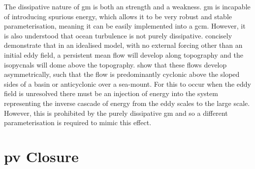 \documentclass[12pt,a4paper]{report}
\begin{document}
        The dissipative nature of \gls{gm} is both an strength and a
         weakness. \gls{gm} is incapable of introducing spurious energy,
         which allows it to be very robust and stable
         parameterisation, meaning it can be easily implemented 
         into a \gls{gcm}. However, it is also understood that
         ocean turbulence is not purely dissipative.
          \cite{adcock2000interactions} concisely demonstrate that
         in an idealised model, with no external forcing other
         than an initial eddy field, a persistent mean flow will develop along
         topography and the isopycnals will dome above the topography.
          \cite{nost2008asymmetry} show that these
         flows develop asymmetrically, such that the flow is 
         predominantly cyclonic above the sloped sides of
         a basin or anticyclonic over a sea-mount. For this to occur 
         when the eddy field is unresolved there must be an 
         injection of energy into the system representing the 
         inverse cascade of energy from the eddy scales to the large scale.
         However, this is prohibited by the purely dissipative \gls{gm}
         and so a different parameterisation is required to mimic this
         effect.
         
         
         
         \section{\gls{pv} Closure}
         
\end{document}
